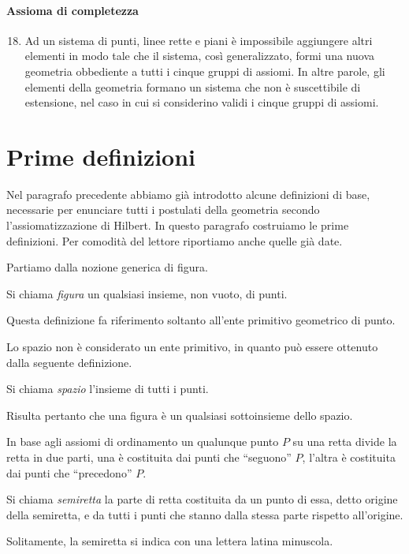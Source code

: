 \paragraph{Assioma di completezza}

\begin{enumerate}[label=\Roman{*}.]
\setcounter{enumi}{17}
\item Ad un sistema di punti, linee rette e piani è impossibile aggiungere altri elementi in modo tale che il sistema, così generalizzato, formi una nuova geometria obbediente a tutti i cinque gruppi di assiomi. In altre parole, gli elementi della geometria formano un sistema che non è suscettibile di estensione, nel caso in cui si considerino validi i cinque gruppi di assiomi.
\end{enumerate}

\section{Prime definizioni}

Nel paragrafo precedente abbiamo già introdotto alcune definizioni di base, necessarie per enunciare tutti i postulati della geometria secondo l'assiomatizzazione di Hilbert. In questo paragrafo costruiamo le prime definizioni. Per comodità del lettore riportiamo anche quelle già date.

Partiamo dalla nozione generica di figura.
\begin{definizione}
Si chiama \emph{figura} un qualsiasi insieme, non vuoto, di punti.
\end{definizione}
Questa definizione fa riferimento soltanto all'ente primitivo geometrico di punto.

Lo spazio non è considerato un ente primitivo, in quanto può essere ottenuto dalla seguente definizione.
\begin{definizione}
Si chiama \emph{spazio} l'insieme di tutti i punti.
\end{definizione}
Risulta pertanto che una figura è un qualsiasi sottoinsieme dello spazio.

In base agli assiomi di ordinamento un qualunque punto $P$ su una retta divide la retta in due parti, una è costituita dai punti che ``seguono'' $P$, l'altra è costituita dai punti che ``precedono'' $P$.
\begin{definizione}
Si chiama \emph{semiretta} la parte di retta costituita da un punto di essa, detto origine della semiretta, e da tutti i punti che stanno dalla stessa parte rispetto all'origine.
\end{definizione}
Solitamente, la semiretta si indica con una lettera latina minuscola.

